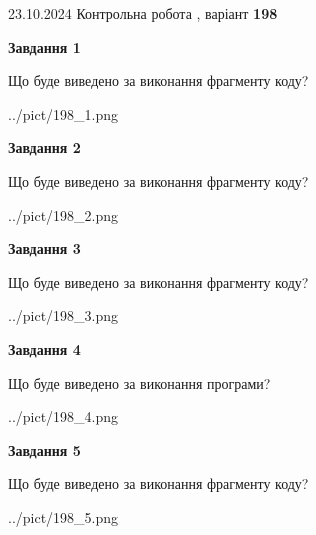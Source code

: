 \documentclass[12pt, ukrainian]{article}
\begin{document}
{\Large{23.10.2024 Контрольна робота , варіант  \No \textbf { 198 }\par}}
{
\begin {large}
{\begin {center}\textbf{Завдання 1}\end {center}}

Що буде виведено за виконання фрагменту коду?\par
\begin{center}
	{../pict/198_1.png}
\end{center}
\newpage

{\begin {center}\textbf{Завдання 2}\end {center}}

Що буде виведено за виконання фрагменту коду?\par
\begin{center}
	{../pict/198_2.png}
\end{center}
\newpage

{\begin {center}\textbf{Завдання 3}\end {center}}

Що буде виведено за виконання фрагменту коду?\par
\begin{center}
	{../pict/198_3.png}
\end{center}
\newpage

{\begin {center}\textbf{Завдання 4}\end {center}}

Що буде виведено за виконання програми?\par
\begin{center}
	{../pict/198_4.png}
\end{center}
\newpage

{\begin {center}\textbf{Завдання 5}\end {center}}

Що буде виведено за виконання фрагменту коду?\par
\begin{center}
	{../pict/198_5.png}
\end{center}
\newpage


\end{large}}
\end{document}
